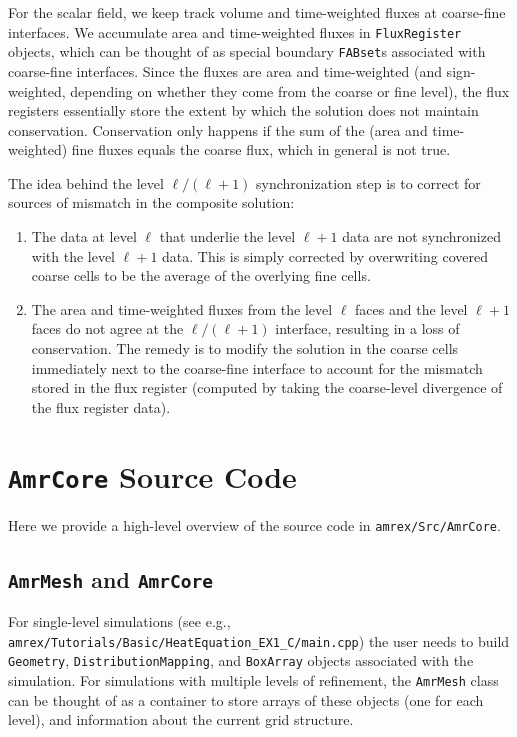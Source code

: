 For the scalar field, we keep track volume and time-weighted fluxes at coarse-fine interfaces.
We accumulate area and time-weighted fluxes in {\tt FluxRegister} objects, which can be
thought of as special boundary {\tt FABset}s associated with coarse-fine interfaces.
Since the fluxes are area and time-weighted (and sign-weighted, depending on whether they
come from the coarse or fine level), the flux registers essentially store the extent by
which the solution does not maintain conservation.  Conservation only happens if the
sum of the (area and time-weighted) fine fluxes equals the coarse flux, which in general 
is not true.

The idea behind the level $\ell/(\ell+1)$ synchronization step is to correct for sources of 
mismatch in the composite solution:
\begin{enumerate}
\item The data at level $\ell$ that underlie the level  $\ell+1$ data are not synchronized with the level $\ell+1$ data.
This is simply corrected by overwriting covered coarse cells to be the average of the overlying fine cells.
\item The area and time-weighted fluxes from the level $\ell$ faces and the level $\ell+1$ faces
do not agree at the $\ell/(\ell+1)$ interface, resulting in a loss of conservation.  
The remedy is to modify the solution in the coarse cells immediately next to the coarse-fine interface
to account for the mismatch stored in the flux register (computed by taking the coarse-level divergence of the
flux register data).
\end{enumerate}

\section{{\tt AmrCore} Source Code}
Here we provide a high-level overview of the source code in {\tt amrex/Src/AmrCore}.

\subsection{{\tt AmrMesh} and {\tt AmrCore}}

For single-level simulations
(see e.g., {\tt amrex/Tutorials/Basic/HeatEquation\_EX1\_C/main.cpp})
the user needs to build {\tt Geometry}, {\tt DistributionMapping},
and {\tt BoxArray} objects associated with the simulation.  For simulations
with multiple levels of refinement, the {\tt AmrMesh} class can be thought
of as a container to store arrays of these objects (one for each level), and
information about the current grid structure.

